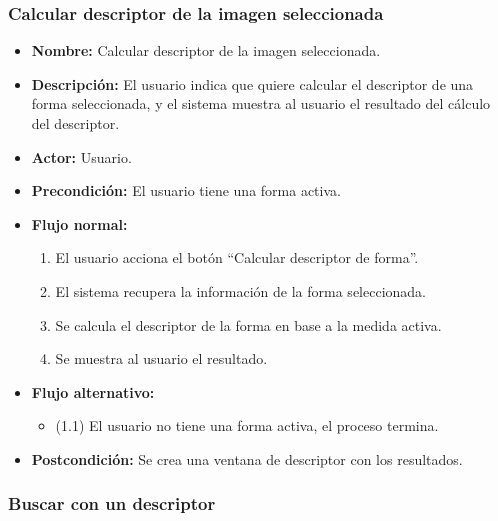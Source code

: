 \subsubsection{Calcular descriptor de la imagen seleccionada}

\begin{itemize}
\item \textbf{Nombre: }Calcular descriptor de la imagen seleccionada.
\item \textbf{Descripción: }El usuario indica que quiere calcular el descriptor de una forma seleccionada, y el sistema muestra al usuario el resultado del cálculo del descriptor.
\item \textbf{Actor: }Usuario.
\item \textbf{Precondición: }El usuario tiene una forma activa.
\item \textbf{Flujo normal: }
\begin{enumerate}
\item El usuario acciona el botón ``Calcular descriptor de forma''.
\item El sistema recupera la información de la forma seleccionada.
\item Se calcula el descriptor de la forma en base a la medida activa.
\item Se muestra al usuario el resultado.
\end{enumerate}
\item \textbf{Flujo alternativo:}
\begin{itemize}
\item (1.1) El usuario no tiene una forma activa, el proceso termina.
\end{itemize}
\item \textbf{Postcondición: }Se crea una ventana de descriptor con los resultados.
\end{itemize}

\subsubsection{Buscar con un descriptor}

